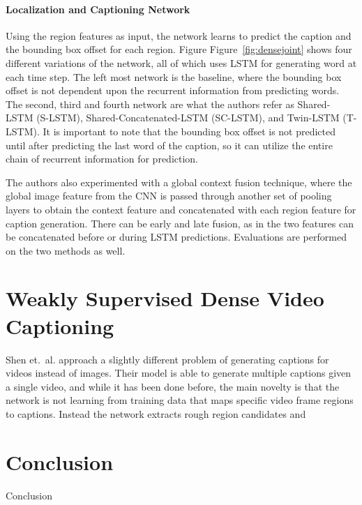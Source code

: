 \documentclass[12pt,onecolumn,letterpaper,draftclsnofoot]{article}
\newcommand{\figref}[1]{Figure~\ref{fig:#1}}
\begin{document}
\paragraph{Localization and Captioning Network}
Using the region features as input, the network learns to predict the caption
and the bounding box offset for each region. Figure \figref{densejoint} shows
four different variations of the network, all of which uses LSTM for
generating word at each time step. The left most network is the baseline,
where the bounding box offset is not dependent upon the recurrent information
from predicting words. The second, third and fourth network are what the
authors refer as Shared-LSTM (S-LSTM), Shared-Concatenated-LSTM (SC-LSTM), and
Twin-LSTM (T-LSTM). It is important to note that the bounding box offset is
not predicted until after predicting the last word of the caption, so it can
utilize the entire chain of recurrent information for prediction.

The authors also experimented with a global context fusion technique, where
the global image feature from the CNN is passed through another set of pooling
layers to obtain the context feature and concatenated with each region feature
for caption generation. There can be early and late fusion, as in the two
features can be concatenated before or during LSTM predictions. Evaluations
are performed on the two methods as well.

\section{Weakly Supervised Dense Video Captioning}
Shen et.\ al.\cite{denseshen} approach a slightly different problem of
generating captions for videos instead of images. Their model is able to
generate multiple captions given a single video, and while it has been done
before, the main novelty is that the network is not learning from training
data that maps specific video frame regions to captions. Instead the network
extracts rough region candidates and 

\section{Conclusion}

Conclusion

{\small


}
\end{document}

